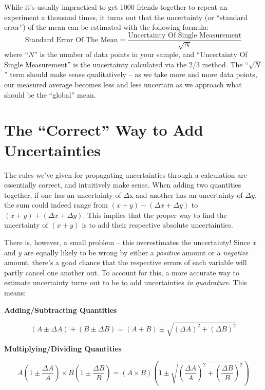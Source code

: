 \documentclass[letterpaper, 12pt]{book}
\newcommand{\myskip}{\vspace{0.5\baselineskip}}
\begin{document}
While it's usually impractical to get 1000 friends together to repeat an experiment a thousand times, it turns out that the uncertainty (or ``standard error'') of the mean can be estimated with the following formula:
\begin{equation}
    \text{Standard Error Of The Mean} = \frac{\text{Uncertainty Of Single Measurement}}{\sqrt{N}}
\end{equation}
where ``$N$'' is the number of data points in your sample, and ``Uncertainty Of Single Measurement'' is the uncertainty calculated via the 2/3 method.  The ``$\sqrt{N}$'' term should make sense qualitatively -- as we take more and more data points, our measured average becomes less and less uncertain as we approach what should be the ``global'' mean.

\section{The ``Correct'' Way to Add Uncertainties}

The rules we've given for propagating uncertainties through a calculation are essentially correct, and intuitively make sense.  When adding two quantities together, if one has an uncertainty of $\Delta$x and another has an uncertainty of $\Delta y$, the sum could indeed range from $(x+y) - (\Delta x +  \Delta y)$ to $(x+y) + (\Delta x + \Delta y)$.  This implies that the proper way to find the uncertainty of $(x+y)$ is to add their respective absolute uncertainties. \myskip

There is, however, a small problem -- this overestimates the uncertainty!  Since $x$ and $y$ are equally likely to be wrong by either a \emph{positive} amount or a \emph{negative} amount, there's a good chance that the respective errors of each variable will partly cancel one another out.  To account for this, a more accurate way to estimate uncertainty turns out to be to add uncertainties \emph{in quadrature}.  This means:\myskip

\textbf{Adding/Subtracting Quantities}

\begin{equation}
    (A\pm\Delta A) + (B\pm\Delta B) = (A+B)\pm\sqrt{(\Delta A)^2+(\Delta B)^2}
\end{equation}

\myskip\textbf{Multiplying/Dividing Quantities}

\begin{equation}
    A\left(1\pm\frac{\Delta A}{A}\right) \times B\left(1\pm\frac{\Delta B}{B}\right) = \left(A \times B\right) \left ( 1 \pm\sqrt{\left(\frac{\Delta A}{A}\right)^2+\left(\frac{\Delta B}{B}\right)^2} \right )
\end{equation}
\end{document}
